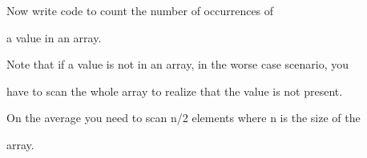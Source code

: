 Now write code to count the number of occurrences of

a value in an array.



Note that if a value is not in an array, in the worse case scenario, you

have to scan the whole array to realize that the value is not present.

On the average you need to scan n/2 elements where n is the size of the

array.

